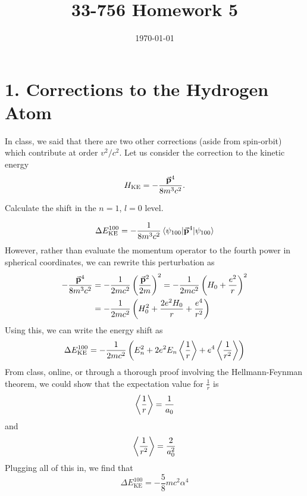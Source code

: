 \documentclass[a4paper,twoside]{article}
\title{33-756 Homework 5}
\date{\today}
\begin{document}
\maketitle

\section*{1. Corrections to the Hydrogen Atom}
In class, we said that there are two other corrections (aside from spin-orbit) which contribute at order $ v^2 / c^2 $. Let us consider the correction to the kinetic energy
\begin{equation}
    H_{\text{KE}} = - \frac{\va{p}^4}{8m^3 c^2}.
\end{equation}

Calculate the shift in the $ n = 1 $, $ l = 0 $ level.

\begin{problem}
    \begin{equation}
        \Delta E_{\text{KE}}^{100} = - \frac{1}{8m^3 c^2} \ev{\va{p}^4}{\psi_{100}}
    \end{equation}
    However, rather than evaluate the momentum operator to the fourth power in spherical coordinates, we can rewrite this perturbation as
    \begin{align}
        - \frac{\va{p}^4}{8m^3 c^2} &= - \frac{1}{2mc^2} \left( \frac{\va{p}^2}{2m} \right)^2 = - \frac{1}{2 m c^2} \left( H_0 + \frac{e^2}{r} \right)^2 \\
        &= - \frac{1}{2m c^2} \left( H_0^2 + \frac{2 e^2 H_0}{r} + \frac{e^4}{r^2} \right)
    \end{align}
    Using this, we can write the energy shift as
    \begin{equation}
        \Delta E_{\text{KE}}^{100} = - \frac{1}{2mc^2} \left( E_n^2 + 2 e^2 E_n \ev{\frac{1}{r}} + e^4 \ev{\frac{1}{r^2}} \right)
    \end{equation}
    From class, online, or through a thorough proof involving the Hellmann-Feynman theorem, we could show that the expectation value for $ \frac{1}{r} $ is
    \begin{equation}
        \ev{\frac{1}{r}} = \frac{1}{a_0}
    \end{equation}
    and
    \begin{equation}
        \ev{\frac{1}{r^2}} = \frac{2}{a_0^2}
    \end{equation}
    Plugging all of this in, we find that
    \begin{equation}
        \Delta E_{\text{KE}}^{100} = - \frac{5}{8} mc^2 \alpha^4
    \end{equation}
\end{problem}
\end{document}
